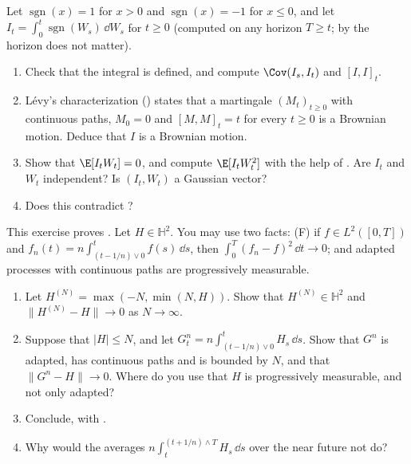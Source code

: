 \begin{exercise}\label{ex:ito-sign}
\medium Let $\operatorname{sgn}(x)=1$ for $x>0$ and $\operatorname{sgn}(x)=-1$ for $x\le0$,
and let $I_t=\int_0^t\operatorname{sgn}(W_s)\,\dd W_s$ for $t\ge0$ (computed on any horizon
$T\ge t$; by  the horizon does not matter).
\begin{enumerate}[label=(\alph*)]
  \item Check that the integral is defined, and compute $\Cov(I_s,I_t)$ and $[I,I]_t$.
  \item L\'evy's characterization () states that a martingale
    $(M_t)_{t\ge0}$ with continuous paths, $M_0=0$ and $[M,M]_t=t$ for every $t\ge0$ is a
    Brownian motion. Deduce that $I$ is a Brownian motion.
  \item Show that $\E[I_tW_t]=0$, and compute $\E[I_tW_t^2]$ with the help of
    . Are $I_t$ and $W_t$ independent? Is $(I_t,W_t)$ a Gaussian
    vector?
  \item Does this contradict ?
\end{enumerate}
\end{exercise}

\begin{exercise}\label{ex:ito-density}
\hard This exercise proves . Let $H\in\mathbb H^2$. You may use two
facts: (F) if $f\in L^2([0,T])$ and $f_n(t)=n\int_{(t-1/n)\vee0}^tf(s)\,\dd s$, then
$\int_0^T(f_n-f)^2\,\dd t\to0$; and adapted processes with continuous paths are progressively
measurable.
\begin{enumerate}[label=(\alph*)]
  \item Let $H^{(N)}=\max(-N,\min(N,H))$. Show that $H^{(N)}\in\mathbb H^2$ and
    $\|H^{(N)}-H\|\to0$ as $N\to\infty$.
  \item Suppose that $|H|\le N$, and let $G^n_t=n\int_{(t-1/n)\vee0}^tH_s\,\dd s$. Show that
    $G^n$ is adapted, has continuous paths and is bounded by $N$, and that
    $\|G^n-H\|\to0$. Where do you use that $H$ is progressively measurable, and not only
    adapted?
  \item Conclude, with .
  \item Why would the averages $n\int_t^{(t+1/n)\wedge T}H_s\,\dd s$ over the near future not
    do?
\end{enumerate}
\end{exercise}

